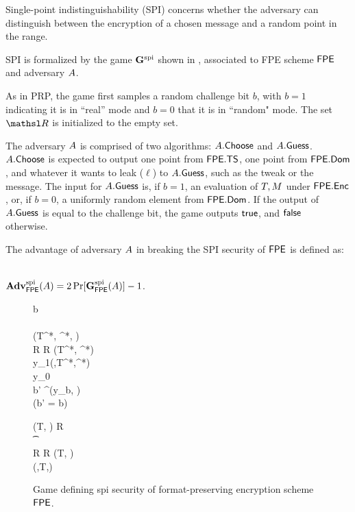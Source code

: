 

Single-point indistinguishability (SPI) concerns whether the adversary can distinguish between the encryption of a chosen message and a random point in the range.\cite{EPRINT:BRRS09} \

	SPI is formalized by the game $\mathbf{G}^{\rm spi}_{}$ shown in , associated to FPE scheme $\mathsf{FPE}$ and adversary $A$.\
    
   As in PRP, the game first samples a random challenge bit $b$, with $b=1$ indicating it is in ``real'' mode and $b=0$ that it is in ``random" mode. The set $\setfont{R}$ is initialized to the empty set. \
   
   The adversary $A$ is comprised of two algorithms: $A.\mathsf{Choose}$ and $A.\mathsf{Guess}$. $A.\mathsf{Choose}$ is expected to output one point from $\mathsf{FPE}.\mathsf{TS}$, one point from $\mathsf{FPE}.\mathsf{Dom}$, and whatever it wants to leak ($\ell$) to $A.\mathsf{Guess}$, such as the tweak or the message. The input for $A.\mathsf{Guess}$ is, if $b=1$, an evaluation of $T, M$ under $\mathsf{FPE}.\mathsf{Enc}$, or, if $b=0$, a uniformly random element from $\mathsf{FPE}.\mathsf{Dom}$. If the output of $A.\mathsf{Guess}$ is equal to the challenge bit, the game outputs $\mathsf{true}$, and $\mathsf{false}$ otherwise.\
   
    The advantage of adversary $A$ in breaking the SPI security of $\mathsf{FPE}$ is defined as: \
     \begin{center}
    $\mathbf{Adv}^{\rm spi}_{\mathsf{FPE}}(A) = 2\Pr[\mathbf{G}^{\rm spi}_{\mathsf{FPE}}(A)]- 1$.\\
     \end{center}
    
  
\begin{figure} [t]
\begin{center}
\fbox
{
\begin{pchstack}
  {
    b \getsr \bits \\
    \key \getsr \Keys{\FPE}  \\
    (T^*, \msg^*, \ell) \getsr \choice{\advA} \\
    R \gets R \cup (T^*, \msg^*) \\
    y_1\gets \Enc{\FPE}(\key,T^*,\msg^*)  \\
    y_0\getsr \Dom{\FPE} \\
    b' \getsr \guess{\advA}^{\EncO}(y_b, \ell) \\
    \pcreturn (b' = b)
  }
  
    \pchspace
    
  {
    \pcif (T, \msg) \in R \pcthen \\
    \t \pcreturn \bot \\
    R \gets R \cup (T, \msg) \\
    \pcreturn \Enc{\FPE}(\key,T,\msg)
  }
\end{pchstack}
}
\end{center}
\vspace{-2ex}
\caption{ Game defining spi security of format-preserving encryption scheme $\mathsf{FPE}$.}
\label{fig-fpe-spi}
\hrulefill
\end{figure}